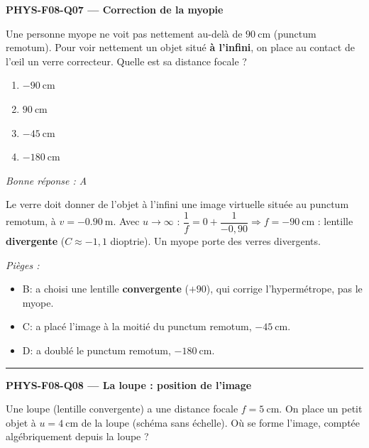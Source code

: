 \documentclass[11pt,a4paper]{article}
\begin{document}
\noindent\textbf{PHYS-F08-Q07 --- Correction de la myopie}\par
Une personne myope ne voit pas nettement au-delà de $\qty{90}{\centi\metre}$ (punctum remotum). Pour voir
nettement un objet situé \textbf{à l'infini}, on place au contact de l'\oe il un verre correcteur. Quelle est
sa distance focale ?
\begin{enumerate}[label=\Alph*)]
\item $\qty{-90}{\centi\metre}$
\item $\qty{90}{\centi\metre}$
\item $\qty{-45}{\centi\metre}$
\item $\qty{-180}{\centi\metre}$
\end{enumerate}
\textit{Bonne réponse : A}\par
Le verre doit donner de l'objet à l'infini une image virtuelle située au punctum remotum, à
$v=\qty{-0.90}{\metre}$. Avec $u\to\infty$ : $\dfrac1f=0+\dfrac{1}{-0{,}90}\Rightarrow f=\qty{-90}{\centi\metre}$ :
lentille \textbf{divergente} ($C\approx-1{,}1$ dioptrie). Un myope porte des verres divergents.\par
\textit{Pièges :}
\begin{itemize}
\item B: a choisi une lentille \textbf{convergente} ($+90$), qui corrige l'hypermétrope, pas le myope.
\item C: a placé l'image à la moitié du punctum remotum, $\qty{-45}{\centi\metre}$.
\item D: a doublé le punctum remotum, $\qty{-180}{\centi\metre}$.
\end{itemize}
\vspace{8pt}\hrule\vspace{8pt}

\noindent\textbf{PHYS-F08-Q08 --- La loupe : position de l'image}\par
Une loupe (lentille convergente) a une distance focale $f=\qty{5}{\centi\metre}$. On place un petit objet à
$u=\qty{4}{\centi\metre}$ de la loupe (schéma sans échelle). Où se forme l'image, comptée algébriquement
depuis la loupe ?

\begin{center}
\end{center}
\end{document}
